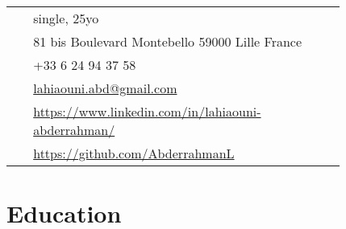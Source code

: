 \documentclass[10pt]{article} %
\begin{document}
\begin{paracol}{2}
\parbox[top][0.12\textheight][c]{\linewidth}{ %
	\vspace{-0.04\textheight} %
	\colorbox{shade}{ %
		\begin{supertabular}{p{0.05\linewidth}|p{0.775\linewidth}} %
			\raisebox{-1pt}{\faUser} & single, 25yo\\ %
			\raisebox{-1pt}{\faHome} & 81 bis Boulevard Montebello 59000 Lille France \\ %
			\raisebox{-1pt}{\faPhone} & +33 6 24 94 37 58 \\ %
			\raisebox{0pt}{\small\faEnvelope} & \href{mailto:lahiaouni.abd@gmail.com}{lahiaouni.abd@gmail.com} \\ %
			\raisebox{-1pt}{\faLinkedinSquare} & \href{https://www.linkedin.com/in/lahiaouni-abderrahman/}{https://www.linkedin.com/in/lahiaouni-abderrahman/} \\ %
			\raisebox{-1pt}{\faLinkedinSquare} & \href{https://github.com/AbderrahmanL}{https://github.com/AbderrahmanL} \\ %
		\end{supertabular}
	}
}


\section{Education} 





\begin{supertabular}{rl} %


\end{supertabular}
\end{paracol}
\end{document}
